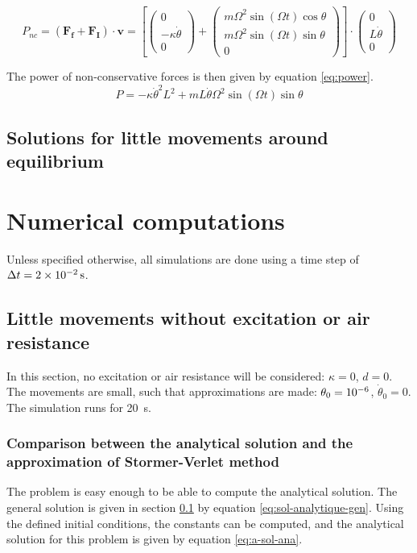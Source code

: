 \documentclass[a4paper,12pt,twoside]{article}
\begin{document}
\begin{equation*}
	P_{nc}= (\mathbf{F_f} + \mathbf{F_I})\cdot \mathbf{v} =
	\left[
	\begin{pmatrix}
		0 \\
		-\kappa \dot{\theta} \\
		0
	\end{pmatrix}
	+ \begin{pmatrix}
		m \Omega^2 \sin(\Omega t) \cos\theta \\
		m \Omega^2 \sin(\Omega t) \sin\theta \\
		0
	\end{pmatrix}
	\right]
	\cdot
	\begin{pmatrix}
		0 \\
		L\dot{\theta} \\
		0
	\end{pmatrix}
\end{equation*}

The power of non-conservative forces is then given by equation \ref{eq:power}.
\begin{equation}
	P = -\kappa\dot{\theta}^2 L^2 + mL\dot{\theta} \Omega^2 \sin(\Omega t) \sin\theta
	\label{eq:power}
\end{equation}


\subsection{Solutions for little movements around equilibrium}\label{sec:sol-analytique}
\section{Numerical computations}

Unless specified otherwise, all simulations are done using a time step of $\Delta t = \SI{2d-2}{\s}$.

\subsection{Little movements without excitation or air resistance}
In this section, no excitation or air resistance will be considered: $\kappa = 0$, $d = 0$.
The movements are small, such that approximations are made: $\theta_0 = \num{d-6}$, $\dot{\theta}_0 = 0$.
The simulation runs for \SI{20}{\second}.

\subsubsection{Comparison between the analytical solution and the approximation of Stormer-Verlet method}
The problem is easy enough to be able to compute the analytical solution.
The general solution is given in section \ref{sec:sol-analytique} by equation \ref{eq:sol-analytique-gen}.
Using the defined initial conditions, the constants can be computed, and the analytical solution for this problem is given by equation \ref{eq:a-sol-ana}.
\end{document}
